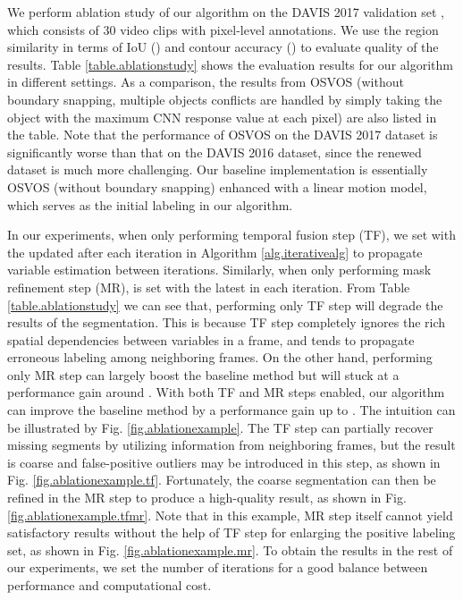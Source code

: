 \documentclass[10pt,twocolumn,letterpaper]{article}
\begin{document}
We perform ablation study of our algorithm on the DAVIS 2017 validation set \cite{PontTuset2017davischallenge},
which consists of 30 video clips with pixel-level annotations. We use the region similarity in
terms of IoU () and contour accuracy () to evaluate quality of the results.
Table \ref{table.ablationstudy} shows the evaluation results for our algorithm in different settings.
As a comparison, the results from OSVOS \cite{caelles2017one} (without boundary snapping,
multiple objects conflicts are handled by simply taking the object with the maximum CNN response value at each pixel)
are also listed in the table.
Note that the performance of OSVOS on the DAVIS 2017 dataset is significantly worse than that on the DAVIS 2016 dataset,
since the renewed dataset is much more challenging.
Our baseline implementation is essentially OSVOS (without boundary snapping) enhanced with a linear motion model,
which serves as the initial labeling in our algorithm.

In our experiments, when only performing temporal fusion step (TF), 
we set  with the updated  after each iteration in Algorithm \ref{alg.iterativealg}
to propagate variable estimation between iterations. 
Similarly, when only performing mask refinement step (MR),  is set with the latest  in each iteration.
From Table \ref{table.ablationstudy} we can see that, performing only TF step will degrade the results of the segmentation.
This is because TF step completely ignores the rich spatial dependencies between variables in a frame, 
and tends to propagate erroneous labeling among neighboring frames. 
On the other hand, performing only MR step can largely boost the baseline method but will
stuck at a performance gain around .
With both TF and MR steps enabled, our algorithm can improve the baseline method by a performance gain up to .
The intuition can be illustrated by Fig. \ref{fig.ablationexample}.
The TF step can partially recover missing segments by utilizing information from neighboring frames, but the result
is coarse and false-positive outliers may be introduced in this step, as shown in Fig. \ref{fig.ablationexample.tf}.
Fortunately, the coarse segmentation can then be refined in the MR step to produce a high-quality result, as shown in Fig. \ref{fig.ablationexample.tfmr}.
Note that in this example, MR step itself cannot yield satisfactory results without the help of TF step for enlarging the positive labeling set,
as shown in Fig. \ref{fig.ablationexample.mr}.
To obtain the results in the rest of our experiments, we set the number of iterations  for a good balance between  
performance and computational cost.
\end{document}
